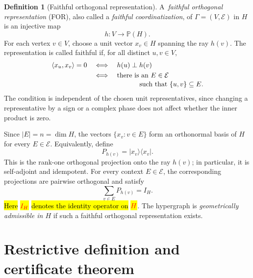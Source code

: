 \documentclass[
  twocolumn,
  aps,
  pra,
  floatfix,
  amsmath,amssymb,
  longbibliography
]{revtex4-2}
\theoremstyle{definition}
\newtheorem{definition}[theorem]{Definition}
\theoremstyle{remark}
\newcommand{\E}{\mathcal E}
\newcommand{\Pc}{\mathbb P}
\newcommand{\corr}[1]{{\color{red}\hl{#1}}}
\newcommand{\corrmath}[1]{\begingroup\setlength{\fboxsep}{1pt}\colorbox{yellow}{\ensuremath{\color{red}#1}}\endgroup}
\begin{document}
\begin{definition}[Faithful orthogonal representation]
A~\emph{faithful orthogonal representation} (FOR), also called a
\emph{faithful coordinatization}, of $\Gamma=(V,\E)$ in $H$ is an injective
map
\[
 h:V\to\Pc(H).
\]
For each vertex $v\in V$, choose a unit vector $x_v\in H$ spanning the ray
$h(v)$.  The representation is called faithful if, for all distinct
$u,v\in V$,
\begin{equation}
 \begin{split}
  \langle x_u,x_v\rangle=0
  &\quad\Longleftrightarrow\quad h(u)\perp h(v)\\
  &\quad\Longleftrightarrow\quad
  \text{there is an }E\in\E\\[-2pt]
  &\hspace{2.7cm}\text{such that }\{u,v\}\subseteq E.
 \end{split}
 \label{eq:faithful}
\end{equation}
The condition is independent of the chosen unit representatives, since
changing a representative by a sign or a complex phase does not affect
whether the inner product is zero.

Since $|E|=n=\dim H$, the vectors
$\{x_v:v\in E\}$ form an orthonormal basis of $H$ for every $E\in\E$.
Equivalently, define
\[
 P_{h(v)}=|x_v\rangle\langle x_v|.
\]
This is the rank-one orthogonal projection onto the ray $h(v)$; in
particular, it is self-adjoint and idempotent.  For every context
$E\in\E$, the corresponding projections are pairwise orthogonal and satisfy
\begin{equation}
 \sum_{v\in E}P_{h(v)}=I_H.
 \label{eq:projector-context}
\end{equation}
\corr{Here} \corrmath{I_H} \corr{denotes the identity operator on} \corrmath{H}.
The hypergraph is \emph{geometrically admissible in $H$} if such a faithful
orthogonal representation exists.
\end{definition}

\section{Restrictive definition and certificate theorem}
\label{sec:definition}
\end{document}
